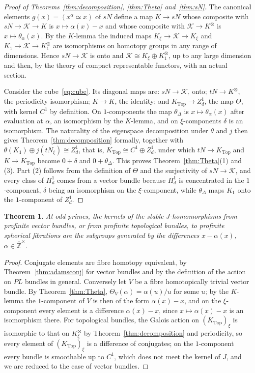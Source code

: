 \documentclass[11pt]{amsart}
\theoremstyle{plain}
\newtheorem{theorem}{Theorem}[section]
\theoremstyle{definition}
\numberwithin{equation}{section}
\newcommand{\Zhat}{\widehat{\mathbb{Z}}}
\newcommand{\Ktop}{K_{\mathrm{Top}}}
\newcommand{\units}{^{\times}}
\begin{document}
\begin{proof}[Proof of Theorems~\ref{thm:decomposition}, \ref{thm:Theta} and~\ref{thm:sN}]
The canonical elements $g(x)=(x^\alpha\simeq x)$ of $sN$ define a map $K\to sN$ whose composite with $sN\to\mathcal K\to K$ is $x\mapsto\alpha(x)-x$ and whose composite with $\mathcal K\to K^\otimes$ is $x\mapsto\theta_\alpha(x)$.
By the $K$-lemma the induced maps $K_\xi\to\mathcal K\to K_\xi$ and $K_1\to\mathcal K\to K^\otimes_1$ are isomorphisms on homotopy groups in any range of dimensions.
Hence $sN\to\mathcal K$ is onto and $\mathcal K\cong K_\xi\oplus K^\otimes_1$, up to any large dimension and then, by the theory of compact representable functors, with an actual section.

Consider the cube~\eqref{eq:cube}.
Its diagonal maps are: $sN\to\mathcal K$, onto; $tN\to K^\otimes$, the periodicity isomorphism; $K\to K$, the identity; and $\Ktop\to Z^1_d$, the map $\Theta$, with kernel $C^1$ by definition.
On $1$-components the map $\theta_\Delta$ is $x\mapsto\theta_\alpha(x)$ after evaluation at $\alpha$, an isomorphism by the $K$-lemma, and on $\xi$-components $\delta$ is an isomorphism.
The naturality of the eigenspace decomposition under $\theta$ and $j$ then gives Theorem~\ref{thm:decomposition} formally, together with $\theta(K_1)\oplus j(tN_\xi)\cong Z^1_d$, that is, $\Ktop\cong C^1\oplus Z^1_d$, under which $tN\to\Ktop$ and $K\to\Ktop$ become $0+\delta$ and $0+\theta_\Delta$.
This proves Theorem~\ref{thm:Theta}(1) and (3).
Part (2) follows from the definition of $\Theta$ and the surjectivity of $sN\to\mathcal K$, and every class of $H^1_d$ comes from a vector bundle because $H^1_d$ is concentrated in the $1$-component, $\delta$ being an isomorphism on the $\xi$-component, while $\theta_\Delta$ maps $K_1$ onto the $1$-component of $Z^1_d$.
\end{proof}

\begin{theorem}\label{thm:Jkernel}
At odd primes, the kernels of the stable $J$-homomorphisms from profinite vector bundles, or from profinite topological bundles, to profinite spherical fibrations are the subgroups generated by the differences $x-\alpha(x)$, $\alpha\in\Zhat\units$.
\end{theorem}

\begin{proof}
Conjugate elements are fibre homotopy equivalent, by Theorem~\ref{thm:adamsconj} for vector bundles and by the definition of the action on $PL$ bundles in general.
Conversely let $V$ be a fibre homotopically trivial vector bundle.
By Theorem~\ref{thm:Theta}, $\Theta_V(\alpha)=\alpha(u)/u$ for some $u$; by the $K$-lemma the $1$-component of $V$ is then of the form $\alpha(x)-x$, and on the $\xi$-component every element is a difference $\alpha(x)-x$, since $x\mapsto\alpha(x)-x$ is an isomorphism there.
For topological bundles, the Galois action on $(\Ktop)_\xi$ is isomorphic to that on $K^\otimes_\xi$ by Theorem~\ref{thm:decomposition} and periodicity, so every element of $(\Ktop)_\xi$ is a difference of conjugates; on the $1$-component every bundle is smoothable up to $C^1$, which does not meet the kernel of $J$, and we are reduced to the case of vector bundles.
\end{proof}
\end{document}
